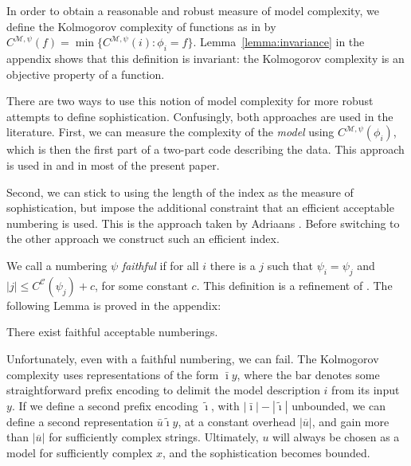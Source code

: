 \documentclass{style/llncs}
\newcommand{\M}{\mathscr M}
\newcommand{\C}{\mathscr C}
\newcommand{\br}[1]{\overline{#1}}
\begin{document}
In order to obtain a reasonable and robust measure of model complexity, we define the Kolmogorov complexity of functions as in \cite{grunwald2004shannon,vitanyi2004meaningful} by $C^{\M,\psi}(f) = \min\{C^{\M,\psi}(i):\phi_i=f\}$.
Lemma~\ref{lemma:invariance} in the appendix shows that this definition is invariant: the Kolmogorov complexity is an objective property of a function.

There are two ways to use this notion of model complexity for more robust attempts to define sophistication. Confusingly, both approaches are used in the literature.
First, we can measure the complexity of the \emph{model} using $C^{\M,\psi}(\phi_i)$, which is then the first part of a two-part code describing the data. This approach is used in  \cite{cover1985kolmogorov,gacs2001algorithmic,vitanyi2004meaningful,gellmann1996information} and in most of the present paper.

Second, we can stick to using the length of the index as the measure of sophistication, but impose the additional constraint that an efficient acceptable numbering is used. This is the approach taken by Adriaans \cite{adriaans2012facticity}.  Before switching to the other approach we construct such an efficient index.

We call a numbering $\psi$ \emph{faithful} if for all $i$ there is a $j$ such that $\psi_i=\psi_j$ and $|j|\le C^{\C}(\psi_j)+c$, for some constant $c$. This definition is a refinement of \cite[Definition~10]{adriaans2012facticity}. The following Lemma is proved in the appendix:

\begin{lemma}
There exist faithful acceptable numberings.
\end{lemma}
Unfortunately, even with a faithful numbering, we can fail. The Kolmogorov complexity uses representations of the form $\bar\imath y$, where the bar denotes some straightforward prefix encoding to delimit the model description $i$ from its input $y$. If we define a second prefix encoding $\tilde{\imath}$, with $|\bar\imath|-|\tilde\imath|$ unbounded, we can define a second representation $\bar u \tilde \imath y$, at a constant overhead $|\br{u}|$, and gain more than $|\br{u}|$ for sufficiently complex strings. Ultimately, $u$ will always be chosen as a model for sufficiently complex $x$, and the sophistication becomes bounded.
\end{document}
